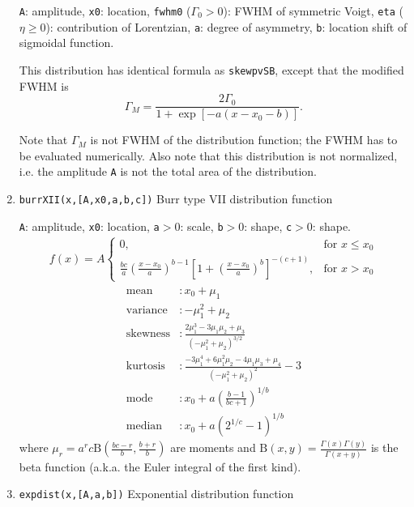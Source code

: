 \documentclass[reprint,showpacs,prb,nofootinbib,amsmath,amssymb]{revtex4-1}
\begin{document}
\begin{enumerate}
\verb|A|: amplitude, \verb|x0|: location, \verb|fwhm0| ($\Gamma_0>0$): FWHM of symmetric Voigt, \verb|eta| ($\eta\geq0$): contribution of Lorentzian, \verb|a|: degree of asymmetry, \verb|b|: location shift of sigmoidal function.

This distribution has identical formula as \verb|skewpvSB|, except that the modified FWHM is 
\begin{equation}
\Gamma_M=\frac{2\Gamma_0}{1+\exp\left[-a(x-x_0-b)\right]}. \nonumber
\end{equation}

Note that $\Gamma_M$ is not FWHM of the distribution function; the FWHM has to be evaluated numerically. Also note that this distribution is not normalized, i.e. the amplitude \verb|A| is not the total area of the distribution. 

\item \verb|burrXII(x,[A,x0,a,b,c])| Burr type VII distribution function~\cite{McLaughlin}

\verb|A|: amplitude, \verb|x0|: location, \verb|a|$>0$: scale, \verb|b|$>0$: shape, \verb|c|$>0$: shape. 
\begin{eqnarray}
f(x)=A
\begin{cases}
0, &\text{for }x\leq x_0 \\
\frac{bc}{a}\left(\frac{x-x_0}{a}\right)^{b-1}\left[1+\left(\frac{x-x_0}{a}\right)^b\right]^{-(c+1)}, &\text{for }x>x_0  \nonumber
\end{cases}
\end{eqnarray}
\begin{align}
	\mbox{mean} 		&: \mbox{$x_0+\mu_1$} \nonumber \\
	\mbox{variance}		&: \mbox{$-\mu_1^2+\mu_2$} \nonumber \\
	\mbox{skewness} 	&: \mbox{$\frac{2\mu_1^3-3\mu_1\mu_2+\mu_3}{(-\mu_1^2+\mu_2)^{3/2}}$} \nonumber \\	
	\mbox{kurtosis} 	&: \mbox{$\frac{-3\mu_1^4+6\mu_1^2\mu_2-4\mu_1\mu_3+\mu_4}{(-\mu_1^2+\mu_2)^2}-3$} \nonumber \\	
	\mbox{mode}         &: \mbox{$x_0+a\left(\frac{b-1}{bc+1}\right)^{1/b}$}  \nonumber \\
	\mbox{median}       &: \mbox{$x_0+a(2^{1/c}-1)^{1/b}$}  \nonumber
\end{align}
where $\mu_r=a^rc\mathrm{B}\left(\frac{bc-r}{b},\frac{b+r}{b}\right)$ are moments and $\mathrm{B}(x,y)=\frac{\Gamma(x)\Gamma(y)}{\Gamma(x+y)}$ is the beta function (a.k.a. the Euler integral of the first kind).

\item \verb|expdist(x,[A,a,b])| Exponential distribution function~\cite{McLaughlin}


\end{enumerate}
\end{document}
